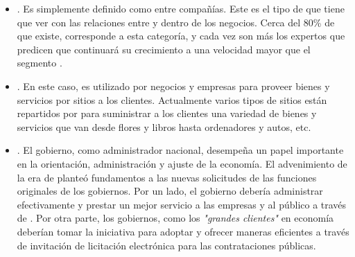 \begin{itemize}
	\item \textbf{\btob}. Es simplemente definido como \ecommerceCOM entre compañías. Este es el tipo de \ecommerceCOM que tiene que ver con las relaciones entre y dentro de los negocios. Cerca del 80\% de \ecommerceCOM que existe, corresponde a esta categoría, y cada vez son más los expertos que predicen que \btob \ecommerceCOM continuará su crecimiento a una velocidad mayor que el segmento \btoc.


	\item \textbf{\btoc}. En este caso, \internetINT es utilizado por negocios y empresas para proveer bienes y servicios por sitios \webINT a los clientes. Actualmente varios tipos de sitios \webINT \btoc están repartidos por \internetINT para suministrar a los clientes una variedad de bienes y servicios que van desde flores y libros hasta ordenadores y autos, etc.

	\item \textbf{\btog}. El gobierno, como administrador nacional, desempeña un papel importante en la orientación, administración y ajuste de la economía. El advenimiento de la era de \ecommerceCOM planteó fundamentos \ecommerceCOM a las nuevas solicitudes de las funciones originales de los gobiernos. Por un lado, el gobierno debería  administrar \emarket efectivamente y prestar un mejor servicio a las empresas y al público a través de \egoverment. Por otra parte, los gobiernos, como los \textit{"grandes clientes"} en economía deberían tomar la iniciativa para adoptar \ecommerceCOM y ofrecer maneras eficientes a través de invitación de licitación electrónica para las contrataciones públicas.



\end{itemize}
